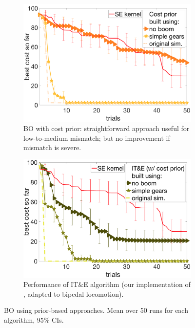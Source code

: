 \begin{figure}[t]
\begin{subfigure}[t]{0.47\textwidth}
\centering
\includegraphics[width=1.0\textwidth]{img/cost_prior_sim_versions.png}
\caption{\small{BO with cost prior: straightforward approach useful for low-to-medium mismatch; but no improvement if mismatch is severe.}}
\label{fig:cost_prior_sim_versions}
\end{subfigure}
\hspace{15px}
\begin{subfigure}[t]{0.47\textwidth}
\centering
\includegraphics[width=1.0\textwidth]{img/cully_prior_sim_versions.png}
\caption{\small{Performance of IT\&E algorithm (our implementation of \citet{cully2015robots}, adapted to bipedal locomotion).}}
\label{fig:cully_prior_sim_versions}
\end{subfigure}
\caption{\small{BO using prior-based approaches. Mean over 50 runs for each algorithm, 95\% CIs.}}
\label{fig:prior_based_bo}
\end{figure}





